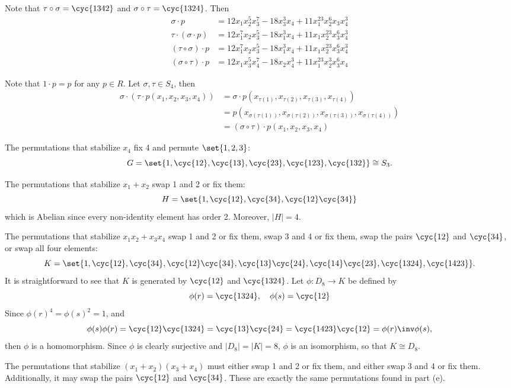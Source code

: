 \begin{solenum}
    \item Note that $\tau \circ \sigma = \cyc{1 3 4 2}$ and $\sigma \circ \tau = \cyc{1 3 2 4}$.
	Then
    \begin{align*}
        \sigma \cdot p & = 12x_1x_2^5x_3^7 - 18x_3^3x_4 + 11x_1^{23}x_2^6x_3x_4^3 \\
        \tau \cdot (\sigma \cdot p) & = 12x_1^7x_2x_3^5 - 18x_1^3x_4 + 11x_1x_2^{23}x_3^6x_4^3 \\
        (\tau \circ \sigma) \cdot p & = 12x_1^7x_2x_3^5 - 18x_1^3x_4 + 11x_1x_2^{23}x_3^6x_4^3  \\
        (\sigma \circ \tau) \cdot p & = 12x_1x_3^5x_4^7 - 18x_2x_4^3 + 11x_1^{23}x_2^3x_3^6x_4
    \end{align*}
    \item Note that $1 \cdot p = p$ for any $p \in R$.
	Let $\sigma, \tau \in S_4$, then
    \begin{align*}
        \sigma \cdot (\tau \cdot p(x_1, x_2, x_3, x_4)) & = \sigma \cdot p(x_{\tau(1)}, x_{\tau(2)}, x_{\tau(3)}, x_{\tau(4)}) \\
        & = p(x_{\sigma(\tau(1))}, x_{\sigma(\tau(2))}, x_{\sigma(\tau(3))}, x_{\sigma(\tau(4))}) \\
        & = (\sigma \circ \tau) \cdot p(x_1, x_2, x_3, x_4)
    \end{align*}
    \item The permutations that stabilize $x_4$ fix 4 and permute $\set{1, 2, 3}$:
    \[
    	G = \set{1, \cyc{1 2}, \cyc{1 3}, \cyc{2 3}, \cyc{1 2 3}, \cyc{1 3 2}} \cong S_3.
    \]
    \item The permutations that stabilize $x_1 + x_2$ swap 1 and 2 or fix them:
    \[
    	H = \set{1, \cyc{1 2}, \cyc{3 4}, \cyc{1 2}\cyc{3 4}}
    \]
    which is Abelian since every non-identity element has order 2.
	Moreover, $|H| = 4$.
    \item The permutations that stabilize $x_1x_2 + x_3x_4$ swap 1 and 2 or fix them, swap 3 and 4 or fix them, swap the pairs $\cyc{1 2}$ and $\cyc{3 4}$, or swap all four elements:
    \[
    	K = \set{1, \cyc{1 2}, \cyc{3 4}, \cyc{1 2}\cyc{3 4}, \cyc{1 3}\cyc{2 4}, \cyc{1 4}\cyc{2 3}, \cyc{1 3 2 4}, \cyc{1 4 2 3}}.
    \]
    It is straightforward to see that $K$ is generated by $\cyc{1 2}$ and $\cyc{1 3 2 4}$.
	Let $\phi : D_8 \to K$ be defined by
    \[
    	\phi(r) = \cyc{1 3 2 4}, \quad \phi(s) = \cyc{1 2}
    \]
    Since $\phi(r)^4 = \phi(s)^2 = 1$, and 
    \[
    	\phi(s) \phi(r) = \cyc{1 2}\cyc{1 3 2 4} = \cyc{1 3}\cyc{2 4} = \cyc{1 4 2 3}\cyc{1 2} = \phi(r)\inv \phi(s),
    \]
	then $\phi$ is a homomorphism.
	Since $\phi$ is clearly surjective and $|D_8| = |K| = 8$, $\phi$ is an isomorphism, so that $K \cong D_8$.
    \item The permutations that stabilize $(x_1 + x_2)(x_3 + x_4)$ must either swap 1 and 2 or fix them, and either swap 3 and 4 or fix them.
	Additionally, it may swap the pairs $\cyc{1 2}$ and $\cyc{3 4}$.
	These are exactly the same permutations found in part (e). \qedhere
\end{solenum}

